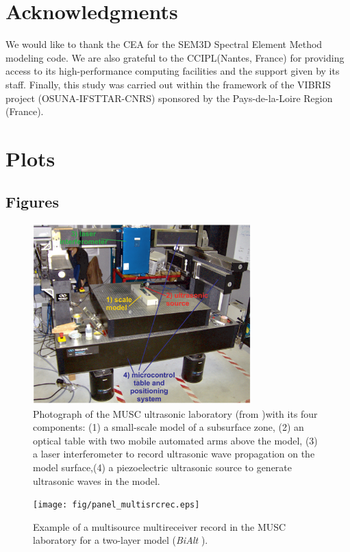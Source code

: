 \documentclass[paper,extra]{gji} %
\newcommand{\bialt}{\textit{BiAlt} }
\begin{document}
\section*{Acknowledgments}

\noindent We would like to thank the CEA for the SEM3D Spectral Element Method modeling code. We are also grateful to the CCIPL(Nantes, France) for providing access to its high-performance computing facilities and the support given  by its staff. Finally, this study was carried out within the framework of the VIBRIS project (OSUNA-IFSTTAR-CNRS) sponsored by the Pays-de-la-Loire Region (France). 

\section{Plots}

\subsection{Figures}

\begin{figure}
\centering
\includegraphics[width=0.75\textwidth]{fig/panel_musc_bench.eps}
\caption{Photograph of the MUSC ultrasonic laboratory (from \citet{Bretaudeau_FWI_2013} )with its four components: (1) a small-scale model of a subsurface zone, (2) an optical table with two mobile automated arms above the model, (3) a laser interferometer to record ultrasonic wave propagation on the model surface,(4) a piezoelectric ultrasonic source to generate ultrasonic waves in the model.}
\label{panel_musc_bench}
\end{figure}

\begin{figure}
\centering
\texttt{[image: fig/panel\_multisrcrec.eps]}
\caption{Example of a multisource multireceiver record in the MUSC laboratory for a two-layer model (\bialt).}
\label{panel_multisrcrec}
\end{figure}
\end{document}
